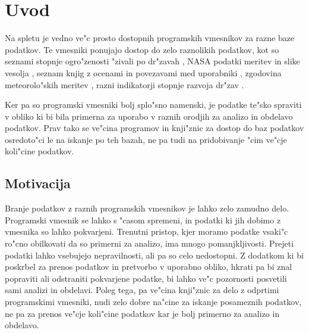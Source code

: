 \chapter{Uvod}

Na spletu je vedno ve"c prosto dostopnih programskih vmesnikov za razne
baze podatkov. Te vmesniki ponujajo dostop do zelo raznolikih podatkov, kot so 
seznami stopnje ogro"zenosti "zivali po dr"zavah 
, 
NASA podatki meritev in slike vesolja 
, 
seznam knjig z ocenami in povezavami med uporabniki 
,
zgodovina meteorolo"skih meritev
, 
razni indikatorji stopnje razvoja dr"zav
.

Ker pa so programski vmesniki bolj splo"sno namenski, je
podatke te"sko spraviti v obliko ki bi bila primerna za uporabo v raznih 
orodjih za analizo in obdelavo podatkov. Prav tako se ve"cina programov in knji"znic za dostop
do baz podatkov osredoto"ci le na iskanje po teh bazah, ne pa tudi na
pridobivanje "cim ve"cje koli"cine podatkov.






\section{Motivacija}

Branje podatkov z raznih programskih vmesnikov je lahko zelo zamudno delo.
Programski vmesnik se lahko s "casom spremeni, in podatki ki jih dobimo z
vmesnika so lahko pokvarjeni. Trenutni pristop, kjer moramo podatke vsaki"c ro"cno
obilkovati da so primerni za analizo, ima mnogo pomanjkljivosti. Prejeti podatki
lahko vsebujejo nepravilnosti, ali pa so celo nedostopni. Z dodatkom ki bi
poskrbel za prenos podatkov in pretvorbo v uporabno obliko, hkrati pa bi znal
popraviti ali odstraniti pokvarjene podatke, bi lahko ve"c pozornosti posvetili
sami analizi in obdelavi. Poleg tega, pa ve"cina knji"znic za delo z odprtimi
programskimi vmesniki, nudi zelo dobre na"cine za iskanje posameznih podatkov,
ne pa za prenos ve"cje koli"cine podatkov kar je bolj primerno za analizo in
obdelavo.




